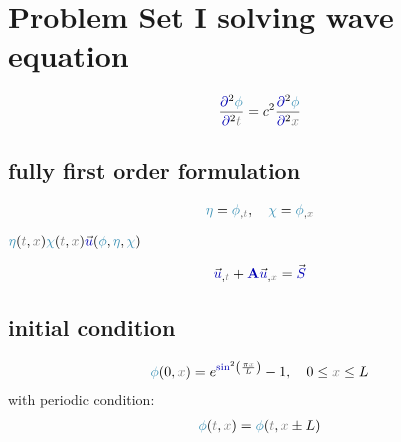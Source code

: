 \documentclass[10pt,fleqn,reqno,a4paper]{article}
\begin{document}
\section{Problem Set I solving wave equation}

\begin{align}
	\frac{\opartial^2\nphi}{\opartial^2\ct} = c^2\frac{\opartial^2\nphi}{\opartial^2\cx}
\end{align}

\subsection{fully first order formulation}

\begin{align}
	\neta = \nphi_{,\ct}, \quad \nchi = \nphi_{,\cx}
\end{align}



$ \neta(\ct,\cx) \nchi(\ct,\cx) \vfu(\nphi,\neta,\nchi) $


\begin{align}
	\vfu_{,\ct}+\MA\vfu_{,\cx}=\vfS
\end{align}



\subsection{initial condition}

\begin{align}
	\nphi(0, \cx)=e^{\fsin^2\left(\frac{\pi \cx}{L}\right)} -1, \quad 0 \leq \cx \leq L
\end{align}
with periodic condition:
\begin{align}
	\nphi(\ct,\cx) = \nphi(\ct, \cx \pm L)
\end{align}
\end{document}
